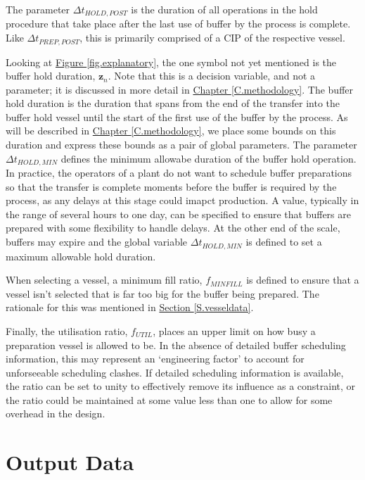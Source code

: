 The parameter $\Delta t_{\mathit{HOLD,POST}}$ is the duration of all operations
in the hold procedure that take place after the last use of buffer by the
process is complete.
Like $\Delta t_{\mathit{PREP,POST}}$, this is primarily comprised of a CIP of
the respective vessel.

Looking at \hyperref[fig.explanatory]{Figure \ref*{fig.explanatory}}, the one
symbol not yet mentioned is the buffer hold duration, $\boldsymbol{z}_{n}$.
Note that this is a decision variable, and not a parameter; it is discussed in
more detail in \hyperref[C.methodology]{Chapter \ref*{C.methodology}}.
The buffer hold duration is the duration that spans from the end of the
transfer into the buffer hold vessel until the start of the first use of the
buffer by the process.
As will be described in 
\hyperref[C.methodology]{Chapter \ref*{C.methodology}},
we place some bounds on this duration and express these bounds as a pair of
global parameters.
The parameter $\Delta t_{\mathit{HOLD,MIN}}$ defines the minimum allowabe
duration of the buffer hold operation.
In practice, the operators of a plant do not want to schedule buffer
preparations so that the transfer is complete moments before the buffer is
required by the process, as any delays at this stage could imapct production.
A value, typically in the range of several hours to one day, can be specified
to ensure that buffers are prepared with some flexibility to handle delays.
At the other end of the scale, buffers may expire and the global variable 
$\Delta t_{\mathit{HOLD,MIN}}$ is defined to set a maximum allowable hold
duration.

When selecting a vessel, a minimum fill ratio, $f_{\mathit{MINFILL}}$ is
defined to ensure that a vessel isn't selected that is far too big for the
buffer being prepared. The rationale for this was mentioned in
\hyperref[S.vesseldata]{Section \ref*{S.vesseldata}}.

Finally, the utilisation ratio, $f_{\mathit{UTIL}}$, places an upper limit on
how busy a preparation vessel is allowed to be.
In the absence of detailed buffer scheduling information, this may represent an
`engineering factor' to account for unforseeable scheduling clashes.
If detailed scheduling information is available, the ratio can be set to unity
to effectively remove its influence as a constraint, or the ratio could be
maintained at some value less than one to allow for some overhead in the
design.

\section{Output Data}\label{S.outputdata}

